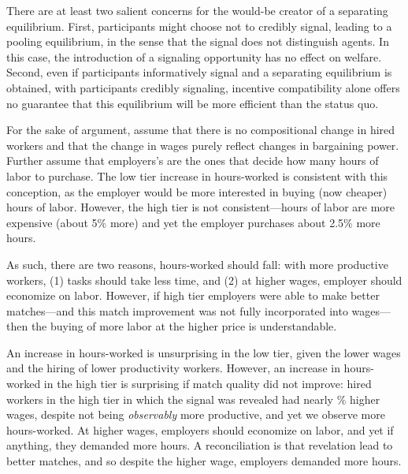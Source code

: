 There are at least two salient concerns for the would-be creator of a separating equilibrium.
First, participants might choose not to credibly signal, leading to a pooling equilibrium, in the sense that the signal does not distinguish agents.
In this case, the introduction of a signaling opportunity has no effect on welfare.
Second, even if participants informatively signal and a separating equilibrium is obtained, with participants credibly signaling, incentive compatibility alone offers no guarantee that this equilibrium will be more efficient than the status quo.

For the sake of argument, assume that there is no compositional change in hired workers and that the change in wages purely reflect changes in bargaining power.
Further assume that employers's are the ones that decide how many hours of labor to purchase. 
The low tier increase in hours-worked is consistent with this conception, as the employer would be more interested in buying (now cheaper) hours of labor.
However, the high tier is not consistent---hours of labor are more expensive (about 5\% more) and yet the employer purchases about 2.5\% more hours. 

As such, there are two reasons, hours-worked should fall:
with more productive workers, (1) tasks should take less time, and (2) at higher wages, employer should economize on labor.
However, if high tier employers were able to make better matches---and this match improvement was not fully incorporated into wages---then the buying of more labor at the higher price is understandable.  


An increase in hours-worked is unsurprising in the low tier, given the lower wages and the hiring of lower productivity workers.
However, an increase in hours-worked in the high tier is surprising if match quality did not improve: 
hired workers in the high tier in which the signal was revealed had nearly \EffectWageBidAppHighTierHiredRegression{}\% higher wages, despite not being \emph{observably} more productive, and yet we observe more hours-worked.
At higher wages, employers should economize on labor, and yet if anything, they demanded more hours.
A reconciliation is that revelation lead to better matches, and so despite the higher wage, employers demanded more hours.



